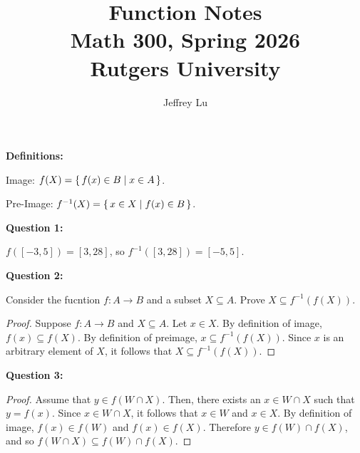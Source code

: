 \documentclass[12pt]{article}
\title{Function Notes\\ \large Math 300, Spring 2026 \\ Rutgers University}
\author{Jeffrey Lu}
\begin{document}
\maketitle

\textbf{Definitions:}

Image: $f(X) = \set{f(x) \in B | x \in A}$.

Pre-Image: $f^{-1}(X) = \set{x \in X | f(x) \in B}$.

\noindent{}\textbf{Question 1:}

$f([-3,5]) = [3,28]$, so $f^{-1}([3,28]) = [-5,5]$.

\noindent{}\textbf{Question 2:}

Consider the fucntion $f: A \rightarrow B$ and a subset $X \subseteq A$.
Prove $X \subseteq f^{-1}(f(X))$.
\begin{proof}
    Suppose $f: A \rightarrow B$ and $X \subseteq A$.
    Let $x \in X$.
    By definition of image, $f(x) \subseteq f(X)$.
    By definition of preimage, $x \subseteq f^{-1}(f(X))$.
    Since $x$ is an arbitrary element of $X$, it follows that $X \subseteq f^{-1}(f(X))$.
\end{proof}

\noindent{}\textbf{Question 3:}

\begin{proof}
    Assume that $y \in f(W \cap X)$.
    Then, there exists an $x \in W \cap X$ such that $y = f(x)$.
    Since $x \in W \cap X$, it follows that $x \in W$ and $x \in X$.
    By definition of image, $f(x) \in f(W)$ and $f(x) \in f(X)$.
    Therefore $y \in f(W) \cap f(X)$, and so $f(W \cap X) \subseteq f(W) \cap f(X)$.
\end{proof}
\end{document}
